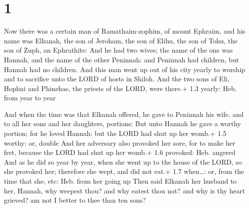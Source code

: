 \hypertarget{section}{%
\section{1}\label{section}}

 Now there was a certain man of Ramathaim-zophim, of mount
Ephraim, and his name was Elkanah, the son of Jeroham, the son of Elihu,
the son of Tohu, the son of Zuph, an Ephrathite:  And he had
two wives; the name of the one was Hannah, and the name of the other
Peninnah: and Peninnah had children, but Hannah had no children.
 And this man went up out of his city yearly to worship and
to sacrifice unto the LORD of hosts in Shiloh. And the two sons of Eli,
Hophni and Phinehas, the priests of the LORD, were there.+ 1.3 yearly:
Heb. from year to year

 And when the time was that Elkanah offered, he gave to
Peninnah his wife, and to all her sons and her daughters, portions:
 But unto Hannah he gave a worthy portion; for he loved
Hannah: but the LORD had shut up her womb.+ 1.5 worthy: or, double
 And her adversary also provoked her sore, for to make her
fret, because the LORD had shut up her womb.+ 1.6 provoked: Heb. angered
 And as he did so year by year, when she went up to the
house of the LORD, so she provoked her; therefore she wept, and did not
eat.+ 1.7 when\ldots: or, from the time that she, etc: Heb. from her
going up  Then said Elkanah her husband to her, Hannah, why
weepest thou? and why eatest thou not? and why is thy heart grieved? am
not I better to thee than ten sons?

